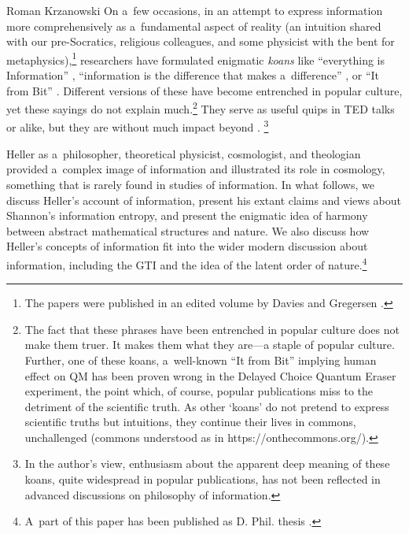 \begin{artengenv}{Roman Krzanowski}
On a~few occasions, in an attempt to express information more comprehensively as a~fundamental aspect of reality (an intuition shared with our pre-Socratics, religious colleagues, and some physicist with the bent for metaphysics),\footnote{The papers were published in an edited volume by Davies and Gregersen 
\parencite*[][]{Davies2010-DAVIAT-5}.%
} researchers have formulated enigmatic \textit{koans} like ``everything is Information'' 
\parencite[][]{jones_everything_2018}, %
 ``information is the difference that makes a~difference'' 
\parencite[see][]{sloman_what_2018}, %
 or ``It from Bit'' 
\parencite[][]{wheeler_information_1989}. %
 Different versions of these have become entrenched in popular culture, yet these sayings do not explain much.\footnote{The fact that these phrases have been entrenched in popular culture does not make them truer. It makes them what they are---a staple of popular culture. Further, one of these koans, a~well-known ``It from Bit'' 
\parencite[][]{wheeler_information_1989} %
 implying human effect on QM has been proven wrong in the Delayed Choice Quantum Eraser experiment, the point which, of course, popular publications miss to the detriment of the scientific truth. As other ‘koans' do not pretend to express scientific truths but intuitions, they continue their lives in commons, unchallenged (commons understood as in https://onthecommons.org/).} They serve as useful quips in TED talks or alike, but they are without much impact beyond 
\parencite[see, e.g.,][]{tetlow_phil_2017}.%
\footnote{In the author's view, enthusiasm about the apparent deep meaning of these koans, quite widespread in popular publications, has not been reflected in advanced discussions on philosophy of information.}



Heller as a~philosopher, theoretical physicist, cosmologist, and theologian provided a~complex image of information and illustrated its role in cosmology, something that is rarely found in studies of information. In what follows, we discuss Heller's account of information, present his extant claims and views about Shannon's information entropy, and present the enigmatic idea of harmony between abstract mathematical structures and nature. We also discuss how Heller's concepts of information fit into the wider modern discussion about information, including the GTI and the idea of the latent order of nature.\footnote{A~part of this paper has been published as D. Phil. thesis 
\parencite[][]{krzanowski_ontological_2022}.%
}




\end{artengenv}

